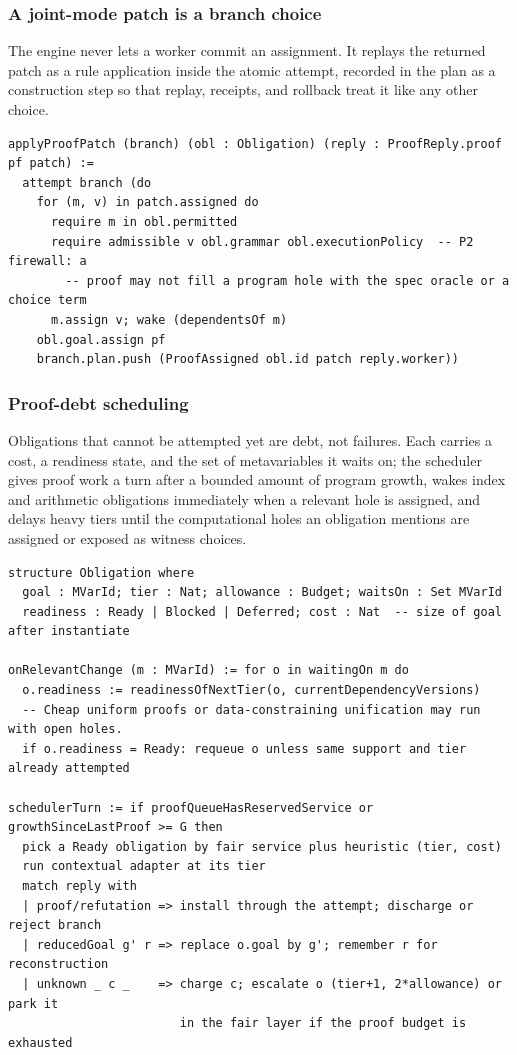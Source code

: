 \subsubsection{A joint-mode patch is a branch choice}

The engine never lets a worker commit an assignment. It replays the returned patch as a rule application inside the atomic attempt, recorded in the plan as a construction step so that replay, receipts, and rollback treat it like any other choice.
\begin{lstlisting}
applyProofPatch (branch) (obl : Obligation) (reply : ProofReply.proof pf patch) :=
  attempt branch (do
    for (m, v) in patch.assigned do
      require m in obl.permitted
      require admissible v obl.grammar obl.executionPolicy  -- P2 firewall: a
        -- proof may not fill a program hole with the spec oracle or a choice term
      m.assign v; wake (dependentsOf m)
    obl.goal.assign pf
    branch.plan.push (ProofAssigned obl.id patch reply.worker))
\end{lstlisting}

\subsubsection{Proof-debt scheduling}

Obligations that cannot be attempted yet are debt, not failures. Each carries a cost, a readiness state, and the set of metavariables it waits on; the scheduler gives proof work a turn after a bounded amount of program growth, wakes index and arithmetic obligations immediately when a relevant hole is assigned, and delays heavy tiers until the computational holes an obligation mentions are assigned or exposed as witness choices.
\begin{lstlisting}
structure Obligation where
  goal : MVarId; tier : Nat; allowance : Budget; waitsOn : Set MVarId
  readiness : Ready | Blocked | Deferred; cost : Nat  -- size of goal after instantiate

onRelevantChange (m : MVarId) := for o in waitingOn m do
  o.readiness := readinessOfNextTier(o, currentDependencyVersions)
  -- Cheap uniform proofs or data-constraining unification may run with open holes.
  if o.readiness = Ready: requeue o unless same support and tier already attempted

schedulerTurn := if proofQueueHasReservedService or growthSinceLastProof >= G then
  pick a Ready obligation by fair service plus heuristic (tier, cost)
  run contextual adapter at its tier
  match reply with
  | proof/refutation => install through the attempt; discharge or reject branch
  | reducedGoal g' r => replace o.goal by g'; remember r for reconstruction
  | unknown _ c _    => charge c; escalate o (tier+1, 2*allowance) or park it
                        in the fair layer if the proof budget is exhausted
\end{lstlisting}

